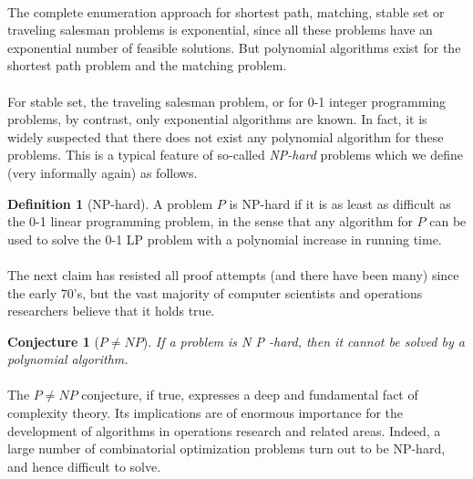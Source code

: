 \documentclass[titlepage]{book}
\makeatletter
\newcommand{\concept}[1]{\toindex{#1}\indexlayout{#1}}
\newcommand{\indexlayout}[1]{\emph{#1}}
\newcommand\toindex{\@ifstar{\@dblarg{\@toindexs}}{\@toindex}}
\def\@toindexs[#1]#2{\index{#1@#2}}
\newcommand\@toindex[2][]{%
  \if\relax\detokenize{#1}\relax
    \begingroup
    \@splitword#2\@nil%
    \uppercase\expandafter{%
      \expandafter\def\expandafter\@initial\expandafter{\@first}}%
    \toks0=\expandafter{\@initial}%
    \toks2=\expandafter{\@rest}%
    \edef\x{\endgroup\noexpand\index{\the\toks0 \the\toks2 }}\x
  \else
    \index{#1}
  \fi
}
\def\@splitword#1#2\@nil{\def\@first{#1}\def\@rest{#2}}
\theoremstyle{plain}
\newtheorem{conjecture}[theorem]{Conjecture}
\theoremstyle{definition}
\newtheorem{definition}[theorem]{Definition}
\theoremstyle{remark}
\makeatother
\begin{document}
\paragraph{}
The complete enumeration approach for shortest path, matching, stable set or traveling salesman problems is exponential, since all these problems have an exponential number of feasible solutions. But polynomial algorithms exist for the shortest path problem and the matching problem.

\paragraph{}
For stable set, the traveling salesman problem, or for 0-1 integer programming problems, by contrast, only exponential algorithms are known. In fact, it is widely suspected that there does not exist any polynomial algorithm for these problems. This is a typical feature of so-called \concept{NP-hard} problems which we define (very informally again) as follows.

\begin{definition}[NP-hard]
A problem $P$ is NP-hard if it is as least as difficult as the 0-1 linear programming problem, in the sense that any algorithm for $P$ can be used to solve the 0-1 LP problem with a polynomial increase in running time.
\end{definition}

\paragraph{}
The next claim has resisted all proof attempts (and there have been many) since the early 70's, but the vast majority of computer scientists and operations researchers believe that it holds true.

\begin{conjecture}[$P\neq NP$]
If a problem is N P -hard, then it cannot be solved by a polynomial algorithm.
\end{conjecture}

\paragraph{}
The $P\neq NP$ conjecture, if true, expresses a deep and fundamental fact of complexity theory. Its implications are of enormous importance for the development of algorithms in operations research and related areas. Indeed, a large number of combinatorial optimization problems turn out to be NP-hard, and hence difficult to solve.
\end{document}
